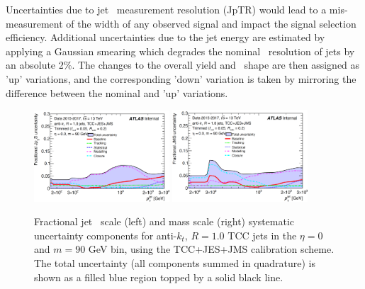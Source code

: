 Uncertainties due to jet \pt\ measurement resolution (JpTR) would lead to a mis-measurement of the width of any observed signal and impact the signal selection efficiency.
Additional uncertainties due to the jet energy are estimated by applying a Gaussian smearing which degrades the nominal \pt\ resolution of jets by an absolute 2\%. %
The changes to the overall yield and \mvh\ shape are then assigned as  'up' variations, and the corresponding 'down' variation is taken by mirroring the difference between the nominal and 'up' variations.

\begin{figure}[htbp!]
\begin{center}
\includegraphics[width=0.45\textwidth]{JpTS_TCC_m90.png}
\includegraphics[width=0.45\textwidth]{JMS_TCC_m90.png}
\end{center}
\caption{Fractional jet \pt\ scale (left) and mass scale (right) systematic uncertainty components for anti-$k_t$, $R=1.0$ TCC jets in the $\eta = 0$ and $m = 90$ GeV bin, using the TCC+JES+JMS calibration scheme.
    The total uncertainty (all components summed in quadrature) is shown as a filled blue region topped by a solid black line.
}
\label{fig:tcc_rtrk}
\end{figure}

